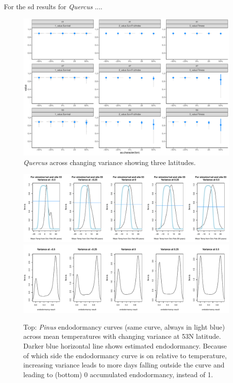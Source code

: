 \documentclass[11pt,letter]{article}
\begin{document}
\clearpage

For the sd results for \emph{Quercus} ....

\begin{figure} 
 \begin{center}
\noindent \includegraphics[width=1\textwidth]{..//analyses/graphs/phenofit/sims/metrics3/sdsim_3metricsQR.pdf}
  \caption{\emph{Quercus} across changing variance showing three latitudes.}
  \label{fig:quercussd3}
  \end{center}
\end{figure}

\begin{figure} 
 \begin{center}
\noindent \includegraphics[width=1\textwidth]{..//analyses/graphs/phenofit/sims/extras/flowerendodorm/flowerendodormPinusMeanTemp53.pdf}
\noindent \includegraphics[width=1\textwidth]{..//analyses/graphs/phenofit/sims/extras/flowerendodorm/flowerendodormPinus53.pdf}
  \caption{Top: \emph{Pinus} endodormancy curves (same curve, always in light blue) across mean temperatures with changing variance at 53\degree N latitude. Darker blue horizontal line shows estimated endodormancy. Because of which side the endodormancy curve is on relative to temperature, increasing variance leads to more days falling outside the curve and leading to (bottom) 0 accumulated endodormancy, instead of 1.} %
  \label{fig:pinusendodorm53}
  \end{center}
\end{figure}
\end{document}
